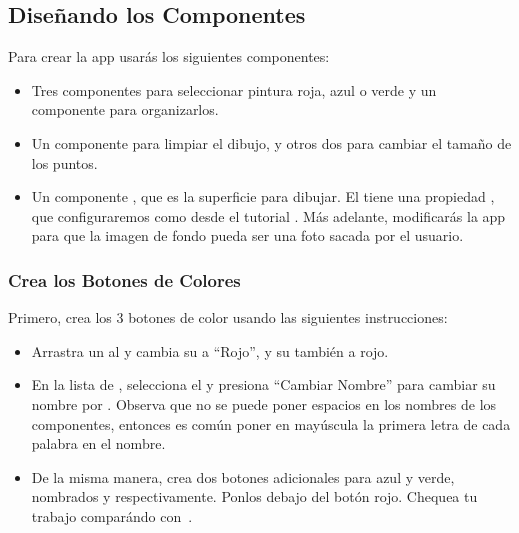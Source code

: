 \subsection*{Diseñando los Componentes}

Para crear la app usarás los siguientes componentes:

\begin{itemize}

\item Tres componentes  para seleccionar pintura
  roja, azul o verde y un componente 
  para organizarlos.

\item Un componente  para limpiar el dibujo, y otros
  dos para cambiar el tamaño de los puntos.

\item Un componente , que es la superficie para
  dibujar. El  tiene una propiedad
  , que configuraremos como
   desde el tutorial . Más
  adelante, modificarás la app para que la imagen de fondo pueda ser
  una foto sacada por el usuario.

\end{itemize}

\subsubsection*{Crea los Botones de Colores}

Primero, crea los 3 botones de color usando las siguientes
instrucciones:

\begin{itemize}
\item Arrastra un  al \viewer y cambia su
   a ``Rojo'', y su  también a
  rojo.

\item En la lista de \componentList, selecciona el 
  y presiona ``Cambiar Nombre'' para cambiar su nombre por
  . Observa que no se puede poner espacios en los
  nombres de los componentes, entonces es común poner en mayúscula la
  primera letra de cada palabra en el nombre.

\item De la misma manera, crea dos botones adicionales para azul y
  verde, nombrados  y 
  respectivamente. Ponlos debajo del botón rojo. Chequea tu trabajo
  comparándo con~.
\end{itemize}

